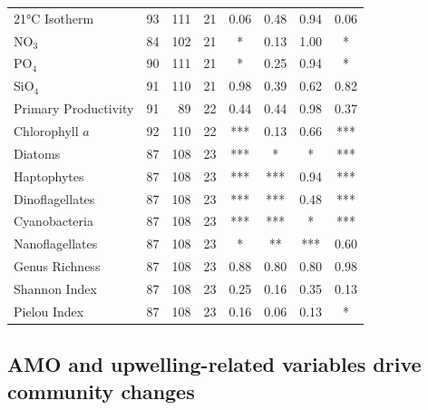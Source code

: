 \documentclass[]{agujournal2019}
\begin{document}
\begin{table}[ht]
{\begin{tabular}{l rrr cccc}
    21°C Isotherm & 93 & 111 & 21 & {\scriptsize 0.06} & {\scriptsize 0.48} & {\scriptsize 0.94} & {\scriptsize 0.06} \\
    NO$_3$ & 84 & 102 & 21 & * & {\scriptsize 0.13} & {\scriptsize 1.00} & * \\
    PO$_4$ & 90 & 111 & 21 & * & {\scriptsize 0.25} & {\scriptsize 0.94} & * \\
    SiO$_4$ & 91 & 110 & 21 & {\scriptsize 0.98} & {\scriptsize 0.39} & {\scriptsize 0.62} & {\scriptsize 0.82} \\
    Primary Productivity & 91 & 89 & 22 & {\scriptsize 0.44} & {\scriptsize 0.44} & {\scriptsize 0.98} & {\scriptsize 0.37} \\
    Chlorophyll $a$ & 92 & 110 & 22 & *** & {\scriptsize 0.13} & {\scriptsize 0.66} & *** \\
    Diatoms & 87 & 108 & 23 & *** & * & * & *** \\
    Haptophytes & 87 & 108 & 23 & *** & *** & {\scriptsize 0.94} & *** \\
    Dinoflagellates & 87 & 108 & 23 & *** & *** & {\scriptsize 0.48} & *** \\
    Cyanobacteria & 87 & 108 & 23 & *** & *** & * & *** \\
    Nanoflagellates & 87 & 108 & 23 & * & ** & *** & {\scriptsize 0.60} \\
    Genus Richness & 87 & 108 & 23 & {\scriptsize 0.88} & {\scriptsize 0.80} & {\scriptsize 0.80} & {\scriptsize 0.98} \\
    Shannon Index & 87 & 108 & 23 & {\scriptsize 0.25} & {\scriptsize 0.16} & {\scriptsize 0.35} & {\scriptsize 0.13} \\
    Pielou Index & 87 & 108 & 23 & {\scriptsize 0.16} & {\scriptsize 0.06} & {\scriptsize 0.13} & * \\
    \hline
    \end{tabular}}
    \end{table}
            

\subsection{AMO and upwelling-related variables drive community changes}
\end{document}
